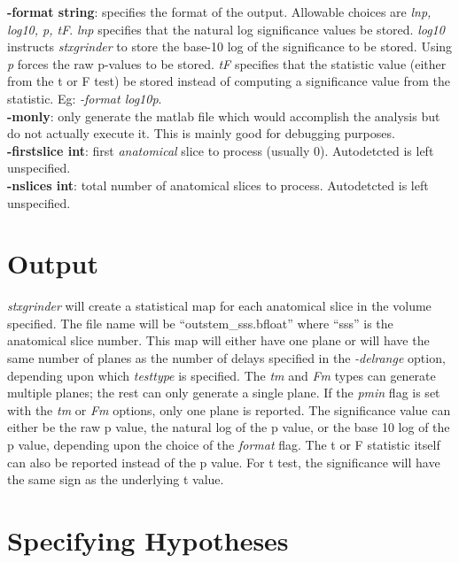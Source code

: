\documentclass[10pt]{article}
\begin{document}
\noindent
{\bf -format string}: specifies the format of the output.  Allowable
choices are {\em lnp, log10, p, tF}.  {\em lnp} specifies that the
natural log significance values be stored.  {\em log10} instructs
{\em stxgrinder} to store the base-10 log of the significance to
be stored.  Using {\em p} forces the raw p-values to be stored.
{\em tF} specifies that the statistic value (either from the t or
F test) be stored instead of computing a significance value from
the statistic. Eg: {\em -format log10p}.\\

\noindent
{\bf -monly}: only generate the matlab file which would accomplish the
analysis but do not actually execute it.  This is mainly good for
debugging purposes.\\

\noindent
{\bf -firstslice int}: first {\em anatomical} slice to process
(usually 0). Autodetcted is left unspecified.\\

\noindent
{\bf -nslices int}: total number of anatomical slices to process.
Autodetcted is left unspecified.\\

\section{Output}

{\em stxgrinder} will create a statistical map for each anatomical
slice in the volume specified.  The file name will be
``outstem\_sss.bfloat'' where ``sss'' is the anatomical slice number.
This map will either have one plane or will have the same number of
planes as the number of delays specified in the {\em -delrange}
option, depending upon which {\em testtype} is specified.  The {\em
tm} and {\em Fm} types can generate multiple planes; the rest can only
generate a single plane.  If the {\em pmin} flag is set with the {\em
tm} or {\em Fm} options, only one plane is reported.  The significance
value can either be the raw p value, the natural log of the p value,
or the base 10 log of the p value, depending upon the choice of the
{\em format} flag.  The t or F statistic itself can also be reported
instead of the p value.  For t test, the significance will have the
same sign as the underlying t value.

\section{Specifying Hypotheses}
\end{document}
